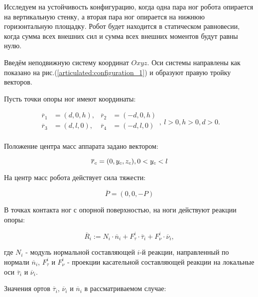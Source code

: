 Исследуем на устойчивость конфигурацию, когда одна пара ног робота опирается на вертикальную стенку, а вторая пара ног опирается на нижнюю горизонтальную площадку. Робот будет находится в статическом равновесии, когда сумма всех внешних сил и сумма всех внешних моментов будут равны нулю.

Введём неподвижную систему координат $Oxyz$. Оси системы направлены как показано на рис.(\ref{articulated:configuration_1}) и образуют правую тройку векторов.

Пусть точки опоры ног имеют координаты:

\begin{equation}
  \label{articulated:case_1_step_points}
  \begin{alignedat}{3}
    \overline{r}_1 &= (d, 0, h) , &\overline{r}_2 &= (-d, 0, h) \\
    \overline{r}_3 &= (d, l, 0) , &\overline{r}_4 &= (-d, l, 0) \\
  \end{alignedat},~l>0, h>0, d>0.
\end{equation}


Положение центра масс аппарата задано вектором:


\begin{equation}
\label{articulated:case_1_center_of_gravity}
  \overline{r}_c = (0, y_c, z_c), 0 < y_c < l\\
\end{equation}


На центр масс робота действует сила тяжести:

\begin{equation}
\label{eq:F_c}
  \overline{P} = (0,0,-P)
\end{equation}

В точках контакта ног с опорной поверхностью, на ноги действуют реакции опоры:

\begin{equation}
\label{eq:reactions}
  \overline{R}_i := N_i\cdot\overline{n}_i + F_\tau^i\cdot\overline{\tau}_i + F_\nu^i\cdot\overline{\nu}_i,
\end{equation}

где $N_i$ - модуль нормальной составляющей $i$-й реакции, направленный по нормали $\overline{n}_i$, $F_\tau^i$ и $F_\nu^i$ - проекции касательной составляющей реакции на локальные оси $\overline{\tau}_i$ и $\overline{\nu}_i$.

Значения ортов $\overline{\tau}_i$, $\overline{\nu}_i$ и $\overline{n}_i$ в рассматриваемом случае:

